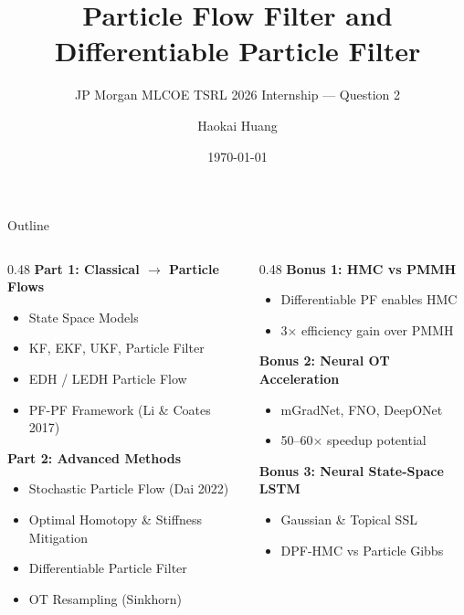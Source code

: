 \documentclass[aspectratio=169,10pt]{beamer}
\title[Particle Flow \& Differentiable PF]{Particle Flow Filter and\\Differentiable Particle Filter}
\subtitle{JP Morgan MLCOE TSRL 2026 Internship --- Question 2}
\author{Haokai Huang}
\date{\today}
\institute{}
\begin{document}
\begin{frame}[plain]
\titlepage
\end{frame}

\begin{frame}{Outline}
\begin{columns}[T]
\begin{column}{0.48\textwidth}
\textbf{Part 1: Classical $\to$ Particle Flows}
\begin{itemize}
  \item State Space Models
  \item KF, EKF, UKF, Particle Filter
  \item EDH / LEDH Particle Flow
  \item PF-PF Framework (Li \& Coates 2017)
\end{itemize}
\vspace{0.5em}
\textbf{Part 2: Advanced Methods}
\begin{itemize}
  \item Stochastic Particle Flow (Dai 2022)
  \item Optimal Homotopy \& Stiffness Mitigation
  \item Differentiable Particle Filter
  \item OT Resampling (Sinkhorn)
\end{itemize}
\end{column}
\begin{column}{0.48\textwidth}
\textbf{Bonus 1: HMC vs PMMH}
\begin{itemize}
  \item Differentiable PF enables HMC
  \item 3$\times$ efficiency gain over PMMH
\end{itemize}
\vspace{0.5em}
\textbf{Bonus 2: Neural OT Acceleration}
\begin{itemize}
  \item mGradNet, FNO, DeepONet
  \item 50--60$\times$ speedup potential
\end{itemize}
\vspace{0.5em}
\textbf{Bonus 3: Neural State-Space LSTM}
\begin{itemize}
  \item Gaussian \& Topical SSL
  \item DPF-HMC vs Particle Gibbs
\end{itemize}
\end{column}
\end{columns}
\end{frame}
\end{document}
